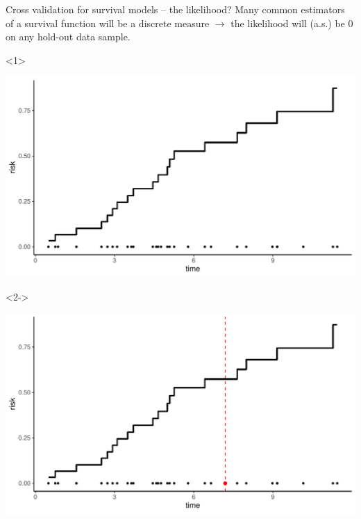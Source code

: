 \documentclass[smaller]{beamer}\usepackage{listings}
\begin{document}
\begin{frame}[label={sec:org8205d06}]{Cross validation for survival models -- the likelihood?}
Many common estimators of a survival function will be a discrete measure \(\rightarrow\) the
likelihood will (a.s.) be 0 on any hold-out data sample.

\begin{onlyenv}<1>
\begin{center}
\includegraphics[width=.9\linewidth]{./km-plot.pdf}
\end{center}
\end{onlyenv}

\begin{onlyenv}<2->
\begin{center}
\includegraphics[width=.9\linewidth]{./km-plot-new-point.pdf}
\end{center}
\end{onlyenv}
\end{frame}
\end{document}
